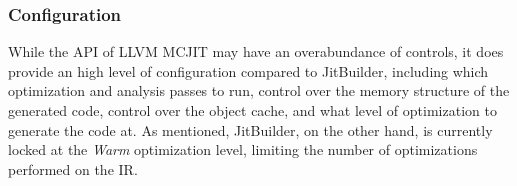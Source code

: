 \subsubsection{Configuration}
While the API of LLVM MCJIT may have an overabundance of controls, it does provide an high level of configuration compared to JitBuilder, including which optimization and analysis passes to run, control over the memory structure of the generated code, control over the object cache, and what level of optimization to generate the code at.
As mentioned, JitBuilder, on the other hand, is currently locked at the \textit{Warm} optimization level, limiting the number of optimizations performed on the IR.
